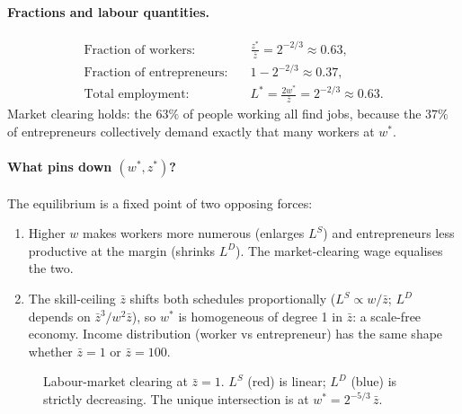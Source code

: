 \documentclass[11pt,a4paper]{article}
\begin{document}
\paragraph{Fractions and labour quantities.}
\begin{align*}
\text{Fraction of workers:}\quad &\frac{z^{*}}{\bar z}=2^{-2/3}\approx 0.63,\\
\text{Fraction of entrepreneurs:}\quad &1-2^{-2/3}\approx 0.37,\\
\text{Total employment:}\quad & L^{*}=\frac{2w^{*}}{\bar z}=2^{-2/3}\approx 0.63.
\end{align*}
Market clearing holds: the $63\%$ of people working all find jobs, because the $37\%$ of entrepreneurs collectively demand exactly that many workers at $w^{*}$.

\paragraph{What pins down $(w^{*},z^{*})$?}
The equilibrium is a fixed point of two opposing forces:
\begin{enumerate}[leftmargin=*,itemsep=1pt]
    \item Higher $w$ makes workers more numerous (enlarges $L^{S}$) and entrepreneurs less productive at the margin (shrinks $L^{D}$). The market-clearing wage equalises the two.
    \item The skill-ceiling $\bar z$ shifts both schedules proportionally ($L^{S}\propto w/\bar z$; $L^{D}$ depends on $\bar z^{3}/w^{2}\bar z$), so $w^{*}$ is homogeneous of degree 1 in $\bar z$: a scale-free economy. Income distribution (worker vs entrepreneur) has the same shape whether $\bar z=1$ or $\bar z=100$.
\end{enumerate}

\begin{figure}[ht]
\centering
{}
\caption{\small Labour-market clearing at $\bar z=1$. $L^{S}$ (red) is linear; $L^{D}$ (blue) is strictly decreasing. The unique intersection is at $w^{*}=2^{-5/3}\,\bar z$.}
\label{fig:q3_eq}
\end{figure}
\end{document}
